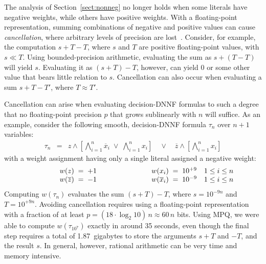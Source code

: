 \documentclass[
hf
]{ceurart}
\newcommand{\obar}[1]{\overline{#1}}
\begin{document}
The analysis of Section~\ref{sect:nonneg} no longer holds when
some literals have negative weights, while others have positive weights.  With a floating-point
representation, summing combinations of negative and positive
values can cause \emph{cancellation}, where arbitrary levels of
precision are lost~\cite{knuth:fp:1981}.  Consider, for example, the computation
$s + T - T$, where $s$ and $T$ are positive floating-point values, with $s \ll T$.  Using
bounded-precision arithmetic, evaluating the sum as $s + (T - T)$ will yield $s$.
Evaluating it as $(s + T) - T$, however, can yield $0$ or some other value that bears little relation to $s$.
Cancellation can also occur when evaluating a sum $s + T - T'$, where $T \approx T'$.

Cancellation can arise when evaluating decision-DNNF formulas to such a degree that no floating-point precision $p$ that grows sublinearly with $n$ will suffice.
As an example, consider the following smooth, decision-DNNF formula $\tau_n$ over $n+1$ variables:
\begin{eqnarray}
\tau_n  & = & z \land \left[\bigwedge_{i = 1}^{n} \obar{x}_i \; \lor \; \bigwedge_{i = 1}^{n} x_i\right] \quad \lor \quad \obar{z} \land \left [\bigwedge_{i = 1}^{n} x_i\right] \label{eqn:max:precision}
\end{eqnarray}
with a weight assignment having only a single literal assigned a negative weight:
\begin{displaymath}
\begin{array}{lllll}
\makebox[1cm]{} &  w(z) \; = \; +1 & \makebox[2cm]{} &  w(x_i) \; = \; 10^{+9} & 1 \leq i \leq n \\
\makebox[1cm]{} &  w(\obar{z}) \; = \; -1 & &  w(\obar{x}_i) \; = \; 10^{-9} & 1 \leq i \leq n \\
\end{array}
\end{displaymath}
Computing $w(\tau_n)$  evaluates the sum $(s + T) - T$, where
$s = 10^{-9n}$ and $T = 10^{+9n}$.  Avoiding cancellation requires using a floating-point representation with a fraction of at least
$p = (18 \cdot \log_2 10)\, n \approx 60 \, n$ bits.
Using MPQ, we were able to compute $w(\tau_{10^7})$ exactly in around 35 seconds, even though the final step requires a total of 1.87~gigabytes to store the arguments
$s+T$ and $-T$, and the result $s$.  In general, however, rational arithmetic can be very time and memory intensive.
\end{document}
